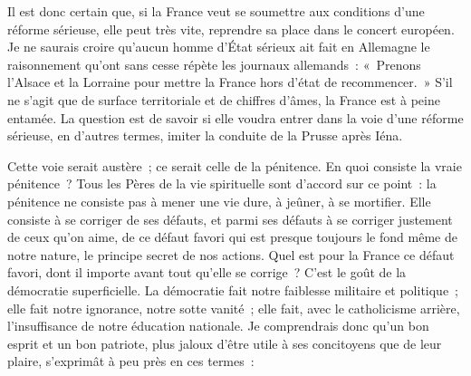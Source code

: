 \documentclass[french,twoside]{book} %
\begin{document}
Il est donc certain que, si la France veut se soumettre aux conditions d’une réforme sérieuse, elle peut très vite, reprendre sa place dans le concert européen. Je ne saurais croire qu’aucun homme d’État sérieux ait fait en Allemagne le raisonnement qu’ont sans cesse répète les journaux allemands : « Prenons l’Alsace et la Lorraine pour mettre la France hors d’état de recommencer. » S’il ne s’agit que de surface territoriale et de chiffres d’âmes, la France est à peine entamée. La question est de savoir si elle voudra entrer dans la voie d’une réforme sérieuse, en d’autres termes, imiter la conduite de la Prusse après Iéna.\par
Cette voie serait austère ; ce serait celle de la pénitence. En quoi consiste la vraie pénitence ? Tous les Pères de la vie spirituelle sont d’accord sur ce point : la pénitence ne consiste pas à mener une vie dure, à jeûner, à se mortifier. Elle consiste à se corriger de ses défauts, et parmi ses défauts à se corriger justement de ceux qu’on aime, de ce défaut favori qui est presque toujours le fond même de notre nature, le principe secret de nos actions. Quel est pour la France ce défaut favori, dont il importe avant tout qu’elle se corrige ? C’est le goût de la démocratie superficielle. La démocratie fait notre faiblesse militaire et politique ; elle fait notre ignorance, notre sotte vanité ; elle fait, avec le catholicisme arrière, l’insuffisance de notre éducation nationale. Je comprendrais donc qu’un bon esprit et un bon patriote, plus jaloux d’être utile à ses concitoyens que de leur plaire, s’exprimât à peu près en ces termes :\par
\end{document}
